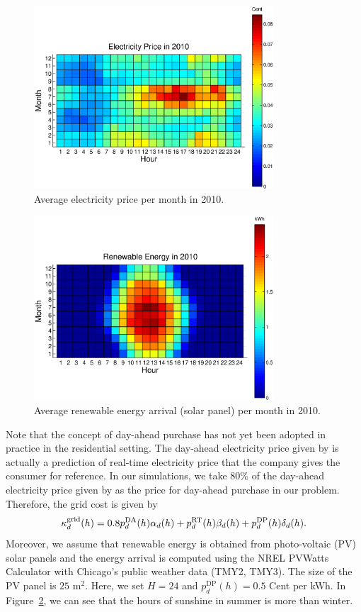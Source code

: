 \begin{figure}[H]
    \centering
    \includegraphics[width = 0.8\textwidth]{fig/p_RT2010.eps}
    \caption{Average electricity price per month in 2010.}
    \label{fig: p_RT2010}
\end{figure}

\begin{figure}[H]
    \centering
    \includegraphics[width = 0.8\textwidth]{fig/r2010.eps}
    \caption{Average renewable energy arrival (solar panel) per month in 2010.}
    \label{fig: r2010}
\end{figure}

Note that the concept of day-ahead purchase has not yet been adopted in practice in the residential setting. The day-ahead electricity price given by \cite{comed:} is actually a prediction of real-time electricity price that the company gives the consumer for reference. In our simulations, we take $80\%$ of the day-ahead electricity price given by \cite{comed:} as the price for day-ahead purchase in our problem. Therefore, the grid cost is given by
\begin{equation}
    \kappa^\text{grid}_d(h) = 0.8 p^{\text{DA}}_d(h)\alpha_d(h)+p^{\text{RT}}_d(h)\beta_d(h)+p^\text{DP}_d(h)\delta_d(h).
\end{equation}
Moreover, we assume that renewable energy is obtained from photo-voltaic (PV) solar panels and the energy arrival is computed using the NREL PVWatts Calculator \cite{nrel:} with Chicago's public weather data (TMY2, TMY3). The size of the PV panel is $25$ m$^2$. Here, we set $H=24$ and $p^{\text{DP}}_d(h) = 0.5$ Cent per kWh. In Figure~\ref{fig: r2010}, we can see that the hours of sunshine in summer is more than winter.



